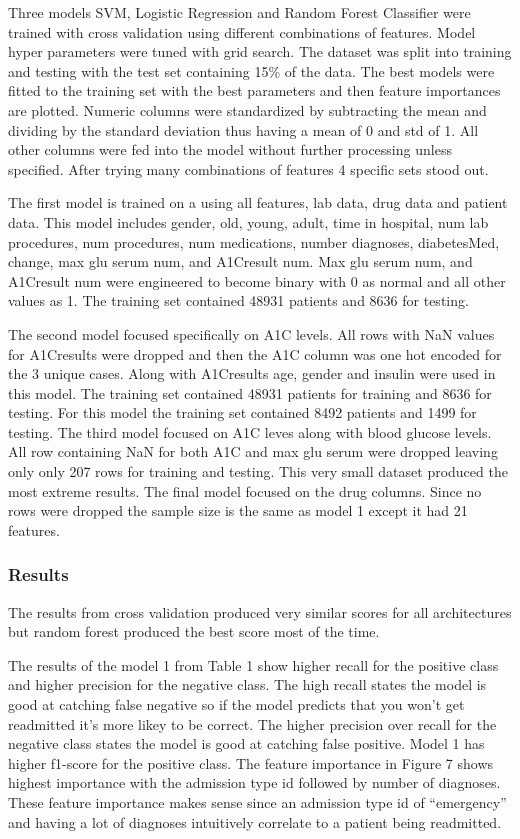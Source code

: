 \documentclass[5p]{elsarticle} %
\begin{document}
Three models SVM, Logistic Regression and Random Forest Classifier were
trained with cross validation using different combinations of features.
Model hyper parameters were tuned with grid search. The dataset was
split into training and testing with the test set containing 15\% of the
data. The best models were fitted to the training set with the best
parameters and then feature importances are plotted. Numeric columns
were standardized by subtracting the mean and dividing by the standard
deviation thus having a mean of 0 and std of 1. All other columns were
fed into the model without further processing unless specified. After
trying many combinations of features 4 specific sets stood out.

The first model is trained on a using all features, lab data, drug data
and patient data. This model includes gender, old, young, adult, time in
hospital, num lab procedures, num procedures, num medications, number
diagnoses, diabetesMed, change, max glu serum num, and A1Cresult num.
Max glu serum num, and A1Cresult num were engineered to become binary
with 0 as normal and all other values as 1. The training set contained
48931 patients and 8636 for testing.

The second model focused specifically on A1C levels. All rows with NaN
values for A1Cresults were dropped and then the A1C column was one hot
encoded for the 3 unique cases. Along with A1Cresults age, gender and
insulin were used in this model. The training set contained 48931
patients for training and 8636 for testing. For this model the training
set contained 8492 patients and 1499 for testing. The third model
focused on A1C leves along with blood glucose levels. All row containing
NaN for both A1C and max glu serum were dropped leaving only only 207
rows for training and testing. This very small dataset produced the most
extreme results. The final model focused on the drug columns. Since no
rows were dropped the sample size is the same as model 1 except it had
21 features.

\hypertarget{results}{%
\subsubsection{Results}\label{results}}

The results from cross validation produced very similar scores for all
architectures but random forest produced the best score most of the
time.

The results of the model 1 from Table 1 show higher recall for the
positive class and higher precision for the negative class. The high
recall states the model is good at catching false negative so if the
model predicts that you won't get readmitted it's more likey to be
correct. The higher precision over recall for the negative class states
the model is good at catching false positive. Model 1 has higher
f1-score for the positive class. The feature importance in Figure 7
shows highest importance with the admission type id followed by number
of diagnoses. These feature importance makes sense since an admission
type id of ``emergency'' and having a lot of diagnoses intuitively
correlate to a patient being readmitted.
\end{document}
